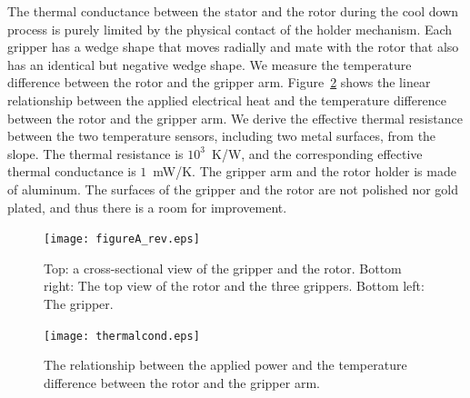 \documentclass[iournal]{IEEEtran}
\begin{document}
The thermal conductance between the stator and the rotor during the cool down process is purely limited by the physical contact of the holder mechanism.
Each gripper has a wedge shape that moves radially and mate with the rotor that also has an identical but negative wedge shape.
We measure the temperature difference between the rotor and the gripper arm.
Figure~\ref{fig:thermalcond} shows the linear relationship between the applied electrical heat and the temperature difference between the rotor and the gripper arm.
We derive the effective thermal resistance between the two temperature sensors, including two metal surfaces, from the slope.
The thermal resistance is $10^{3}$~K/W, and the corresponding effective thermal conductance is $1$~mW/K.
The gripper arm and the rotor holder is made of aluminum.
The surfaces of the gripper and the rotor are not polished nor gold plated, and thus there is a room for improvement.


\begin{figure}[htb]
   \centering
   \texttt{[image: figureA\_rev.eps]} %
   \caption{Top: a cross-sectional view of the gripper and the rotor. Bottom right: The top view of the rotor and the three grippers. Bottom left: The gripper.}
   \label{fig:figureA}
\end{figure}

\begin{figure}[htb]
   \centering
   \texttt{[image: thermalcond.eps]} %
   \caption{The relationship between the applied power and the temperature difference between the rotor and the gripper arm. }
   \label{fig:thermalcond}
\end{figure}
\end{document}

